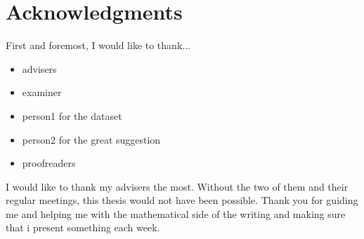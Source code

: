 \chapter{Acknowledgments}

First and foremost, I would like to thank...
\begin{itemize}
\item{advisers}
\item{examiner}
\item{person1 for the dataset}
\item{person2 for the great suggestion}
\item{proofreaders}
\end{itemize}

I would like to thank my advisers the most. Without the two of them and their regular meetings, this thesis would not have been possible. Thank you for guiding me and helping me with the mathematical side of the writing and making sure that i present something each week.
